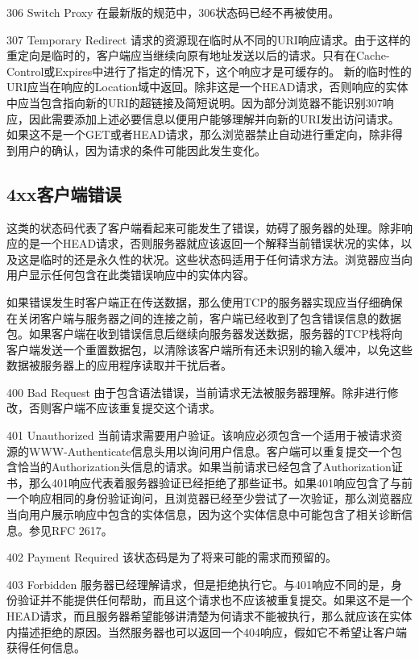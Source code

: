 306 Switch Proxy
在最新版的规范中，306状态码已经不再被使用。

307 Temporary Redirect
请求的资源现在临时从不同的URI响应请求。由于这样的重定向是临时的，客户端应当继续向原有地址发送以后的请求。只有在Cache-Control或Expires中进行了指定的情况下，这个响应才是可缓存的。
新的临时性的URI应当在响应的Location域中返回。除非这是一个HEAD请求，否则响应的实体中应当包含指向新的URI的超链接及简短说明。因为部分浏览器不能识别307响应，因此需要添加上述必要信息以便用户能够理解并向新的URI发出访问请求。
如果这不是一个GET或者HEAD请求，那么浏览器禁止自动进行重定向，除非得到用户的确认，因为请求的条件可能因此发生变化。

\subsection{4xx客户端错误}

这类的状态码代表了客户端看起来可能发生了错误，妨碍了服务器的处理。除非响应的是一个HEAD请求，否则服务器就应该返回一个解释当前错误状况的实体，以及这是临时的还是永久性的状况。这些状态码适用于任何请求方法。浏览器应当向用户显示任何包含在此类错误响应中的实体内容。

如果错误发生时客户端正在传送数据，那么使用TCP的服务器实现应当仔细确保在关闭客户端与服务器之间的连接之前，客户端已经收到了包含错误信息的数据包。如果客户端在收到错误信息后继续向服务器发送数据，服务器的TCP栈将向客户端发送一个重置数据包，以清除该客户端所有还未识别的输入缓冲，以免这些数据被服务器上的应用程序读取并干扰后者。

400 Bad Request
由于包含语法错误，当前请求无法被服务器理解。除非进行修改，否则客户端不应该重复提交这个请求。

401 Unauthorized
当前请求需要用户验证。该响应必须包含一个适用于被请求资源的WWW-Authenticate信息头用以询问用户信息。客户端可以重复提交一个包含恰当的Authorization头信息的请求。如果当前请求已经包含了Authorization证书，那么401响应代表着服务器验证已经拒绝了那些证书。如果401响应包含了与前一个响应相同的身份验证询问，且浏览器已经至少尝试了一次验证，那么浏览器应当向用户展示响应中包含的实体信息，因为这个实体信息中可能包含了相关诊断信息。参见RFC 2617。

402 Payment Required
该状态码是为了将来可能的需求而预留的。

403 Forbidden
服务器已经理解请求，但是拒绝执行它。与401响应不同的是，身份验证并不能提供任何帮助，而且这个请求也不应该被重复提交。如果这不是一个HEAD请求，而且服务器希望能够讲清楚为何请求不能被执行，那么就应该在实体内描述拒绝的原因。当然服务器也可以返回一个404响应，假如它不希望让客户端获得任何信息。

